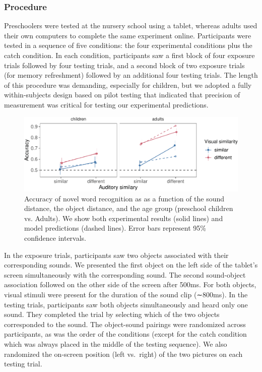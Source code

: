 \documentclass[10pt, letterpaper]{article}
\newenvironment{CodeChunk}{}{}
\begin{document}
\subsubsection{Procedure}\label{procedure}

Preschoolers were tested at the nursery school using a tablet, whereas
adults used their own computers to complete the same experiment online.
Participants were tested in a sequence of five conditions: the four
experimental conditions plus the catch condition. In each condition,
participants saw a first block of four exposure trials followed by four
testing trials, and a second block of two exposure trials (for memory
refreshment) followed by an additional four testing trials. The length
of this procedure was demanding, especially for children, but we adopted
a fully within-subjects design based on pilot testing that indicated
that precision of measurement was critical for testing our experimental
predictions.

\begin{CodeChunk}
\begin{figure}[h]

{\centering \includegraphics{figs/all_data-1} 

}

\caption{\label{fig:data_all}Accuracy of novel word recognition as as a function of the sound distance, the object distance, and the age group (preschool children vs. Adults). We show both experimental results (solid lines) and model predictions (dashed lines). Error bars represent 95\% confidence intervals.}\label{fig:all_data}
\end{figure}
\end{CodeChunk}

In the exposure trials, participants saw two objects associated with
their corresponding sounds. We presented the first object on the left
side of the tablet's screen simultaneously with the corresponding sound.
The second sound-object association followed on the other side of the
screen after 500ms. For both objects, visual stimuli were present for
the duration of the sound clip (∼800ms). In the testing trials,
participants saw both objects simultaneously and heard only one sound.
They completed the trial by selecting which of the two objects
corresponded to the sound. The object-sound pairings were randomized
across participants, as was the order of the conditions (except for the
catch condition which was always placed in the middle of the testing
sequence). We also randomized the on-screen position (left vs.~right) of
the two pictures on each testing trial.
\end{document}
